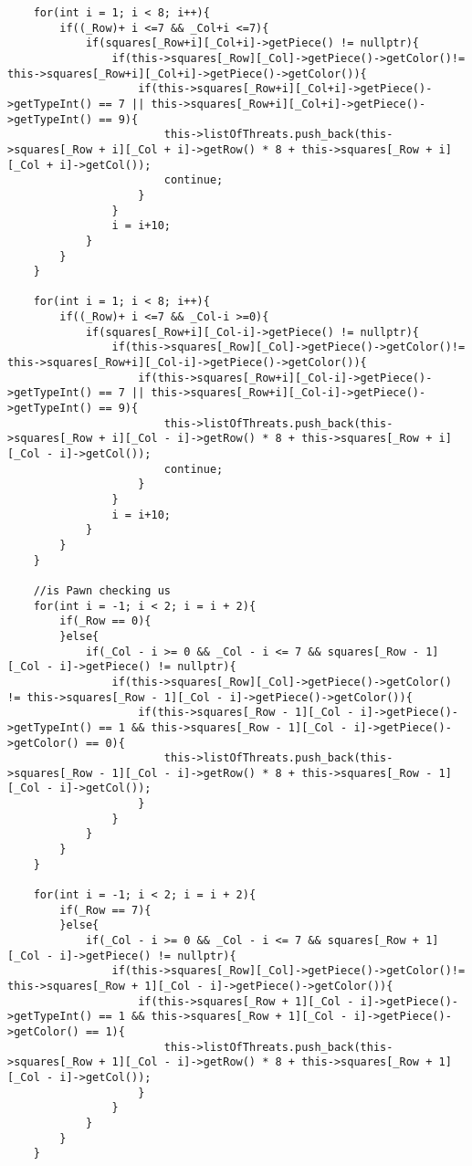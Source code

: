 \documentclass[]{report}
\begin{document}
\begin{flushleft}
\begin{lstlisting}
	for(int i = 1; i < 8; i++){
		if((_Row)+ i <=7 && _Col+i <=7){
			if(squares[_Row+i][_Col+i]->getPiece() != nullptr){
				if(this->squares[_Row][_Col]->getPiece()->getColor()!= this->squares[_Row+i][_Col+i]->getPiece()->getColor()){
					if(this->squares[_Row+i][_Col+i]->getPiece()->getTypeInt() == 7 || this->squares[_Row+i][_Col+i]->getPiece()->getTypeInt() == 9){
						this->listOfThreats.push_back(this->squares[_Row + i][_Col + i]->getRow() * 8 + this->squares[_Row + i][_Col + i]->getCol());
						continue;
					}
				}
				i = i+10;
			}
		}
	}
	
	for(int i = 1; i < 8; i++){
		if((_Row)+ i <=7 && _Col-i >=0){
			if(squares[_Row+i][_Col-i]->getPiece() != nullptr){
				if(this->squares[_Row][_Col]->getPiece()->getColor()!= this->squares[_Row+i][_Col-i]->getPiece()->getColor()){
					if(this->squares[_Row+i][_Col-i]->getPiece()->getTypeInt() == 7 || this->squares[_Row+i][_Col-i]->getPiece()->getTypeInt() == 9){
						this->listOfThreats.push_back(this->squares[_Row + i][_Col - i]->getRow() * 8 + this->squares[_Row + i][_Col - i]->getCol());
						continue;
					}
				}
				i = i+10;
			}
		}
	}
	
	//is Pawn checking us
	for(int i = -1; i < 2; i = i + 2){
		if(_Row == 0){
		}else{
			if(_Col - i >= 0 && _Col - i <= 7 && squares[_Row - 1][_Col - i]->getPiece() != nullptr){
				if(this->squares[_Row][_Col]->getPiece()->getColor() != this->squares[_Row - 1][_Col - i]->getPiece()->getColor()){
					if(this->squares[_Row - 1][_Col - i]->getPiece()->getTypeInt() == 1 && this->squares[_Row - 1][_Col - i]->getPiece()->getColor() == 0){
						this->listOfThreats.push_back(this->squares[_Row - 1][_Col - i]->getRow() * 8 + this->squares[_Row - 1][_Col - i]->getCol());
					}
				}
			}
		}
	}
	
	for(int i = -1; i < 2; i = i + 2){
		if(_Row == 7){
		}else{
			if(_Col - i >= 0 && _Col - i <= 7 && squares[_Row + 1][_Col - i]->getPiece() != nullptr){
				if(this->squares[_Row][_Col]->getPiece()->getColor()!= this->squares[_Row + 1][_Col - i]->getPiece()->getColor()){
					if(this->squares[_Row + 1][_Col - i]->getPiece()->getTypeInt() == 1 && this->squares[_Row + 1][_Col - i]->getPiece()->getColor() == 1){
						this->listOfThreats.push_back(this->squares[_Row + 1][_Col - i]->getRow() * 8 + this->squares[_Row + 1][_Col - i]->getCol());
					}
				}
			}
		}
	}
	

\end{lstlisting}
\end{flushleft}
\end{document}

